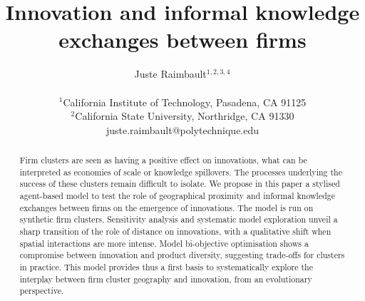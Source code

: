 \documentclass[letterpaper]{article}
\title{Innovation and informal knowledge exchanges between firms}
\author{Juste Raimbault$^{1,2,3,4}$\\
\mbox{}\\
$^1$California Institute of Technology, Pasadena, CA 91125 \\
$^2$California State University, Northridge, CA 91330 \\
juste.raimbault@polytechnique.edu}
\begin{document}
\maketitle

\begin{abstract}
Firm clusters are seen as having a positive effect on innovations, what can be interpreted as economies of scale or knowledge spillovers. The processes underlying the success of these clusters remain difficult to isolate. We propose in this paper a stylised agent-based model to test the role of geographical proximity and informal knowledge exchanges between firms on the emergence of innovations. The model is run on synthetic firm clusters. Sensitivity analysis and systematic model exploration unveil a sharp transition of the role of distance on innovations, with a qualitative shift when spatial interactions are more intense. Model bi-objective optimisation shows a compromise between innovation and product diversity, suggesting trade-offs for clusters in practice. This model provides thus a first basis to systematically explore the interplay between firm cluster geography and innovation, from an evolutionary perspective.
\end{abstract}





\end{document}
